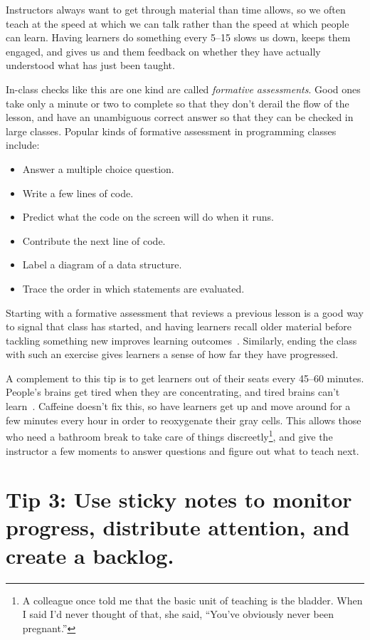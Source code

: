 \documentclass[10pt,letterpaper]{article}
\newcommand{\rulemajor}[1]{\section{#1}}
\begin{document}
Instructors always want to get through material than time allows,
so we often teach at the speed at which we can talk
rather than the speed at which people can learn.
Having learners do something every 5--15 slows us down,
keeps them engaged,
and gives us and them feedback on whether they have actually understood
what has just been taught.

In-class checks like this are one kind are called \emph{formative assessments}.
Good ones take only a minute or two to complete so that they don't derail the flow of the lesson,
and have an unambiguous correct answer so that they can be checked in large classes.
Popular kinds of formative assessment in programming classes include:

\begin{itemize}
  \item Answer a multiple choice question.
  \item Write a few lines of code.
  \item Predict what the code on the screen will do when it runs.
  \item Contribute the next line of code.
  \item Label a diagram of a data structure.
  \item Trace the order in which statements are evaluated.
\end{itemize}

Starting with a formative assessment that reviews a previous lesson
is a good way to signal that class has started,
and having learners recall older material before tackling something new
improves learning outcomes~\cite{Wein2018b}.
Similarly,
ending the class with such an exercise
gives learners a sense of how far they have progressed.

A complement to this tip is to get learners out of their seats every 45--60 minutes.
People's brains get tired when they are concentrating,
and tired brains can't learn~\cite{HPL2}.
Caffeine doesn't fix this,
so have learners get up and move around for a few minutes every hour
in order to reoxygenate their gray cells.
This allows those who need a bathroom break to take care of things discreetly\footnote{A colleague once told me that
the basic unit of teaching is the bladder.
When I said I'd never thought of that,
she said, ``You've obviously never been pregnant.''},
and give the instructor a few moments to answer questions
and figure out what to teach next.

\rulemajor{Tip 3: Use sticky notes to monitor progress, distribute attention, and create a backlog.}
\end{document}
